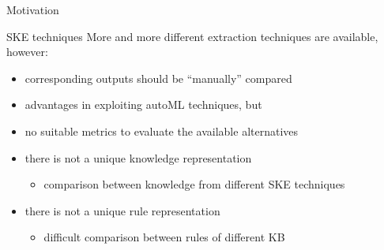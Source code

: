 \documentclass{beamer}
\newcommand{\no}{\item[\ding{56}]}
\newcommand{\lookat}{\item[\ding{43}]}
\begin{document}
\begin{frame}[c]{Motivation}
	
	\begin{block}{SKE techniques}
		\medskip
		More and more different extraction techniques are available, however:
		\begin{itemize}
			\item corresponding outputs should be ``manually'' compared
			\medskip
			\lookat \alert{advantages in exploiting autoML techniques}, but
			\no no suitable metrics to evaluate the available alternatives	
			\medskip
			\item there is not a unique knowledge representation
			\begin{itemize}
				\no comparison between knowledge from different SKE techniques
			\end{itemize}
			\medskip
			\item there is not a unique rule representation
			\begin{itemize}
				\no difficult comparison between rules of different KB
			\end{itemize}
		\end{itemize}
		\medskip
	\end{block}
\end{frame}
\end{document}
